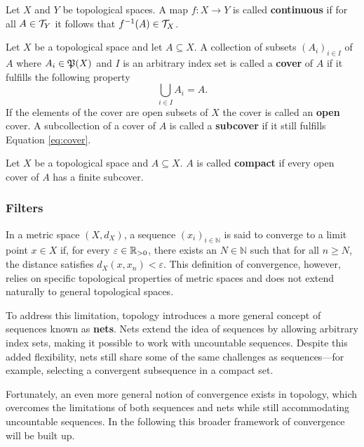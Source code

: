 \begin{defin}
  Let $X$ and $Y$ be topological spaces. A map $f\colon X \to Y$ is called \textbf{continuous} if for all $A \in \mathcal{T}_Y$ it follows that $f^{-1}(A) \in \mathcal{T}_X$.  
\end{defin}

\begin{defin}
  Let $X$ be a topological space and let $A \subseteq X$. A collection of subsets $(A_i)_{i\in I}$ of $A$ where $A_i \in \mathfrak{P}(X)$ and $I$ is an arbitrary index set is called a \textbf{cover} of $A$ if it fulfills the following property
  \begin{equation}\label{eq:cover}
    \bigcup\limits_{i\in I}A_i = A.
  \end{equation}
  If the elements of the cover are open subsets of $X$ the cover is called an \textbf{open} cover.
  A subcollection of a cover of $A$ is called a \textbf{subcover} if it still fulfills Equation \ref{eq:cover}.
\end{defin}

\begin{defin}
  Let $X$ be a topological space and $A \subseteq X$. $A$ is called \textbf{compact} if every open cover of $A$ has a finite subcover. 
\end{defin}

\subsubsection{Filters}
In a metric space \((X, d_X)\), a sequence \((x_i)_{i \in \mathbb{N}}\) is said to converge to a limit point \(x \in X\) if, for every \(\varepsilon \in \mathbb{R}_{>0}\), there exists an \(N \in \mathbb{N}\) such that for all \(n \geq N\), the distance satisfies \(d_X(x, x_n) < \varepsilon\). This definition of convergence, however, relies on specific topological properties of metric spaces and does not extend naturally to general topological spaces. 

To address this limitation, topology introduces a more general concept of sequences known as \textbf{nets}. Nets extend the idea of sequences by allowing arbitrary index sets, making it possible to work with uncountable sequences. Despite this added flexibility, nets still share some of the same challenges as sequences—for example, selecting a convergent subsequence in a compact set.

Fortunately, an even more general notion of convergence exists in topology, which overcomes the limitations of both sequences and nets while still accommodating uncountable sequences. In the following this broader framework of convergence will be built up.

